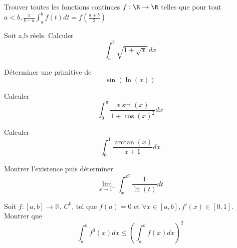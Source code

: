 \documentclass[11pt,a4paper]{article}
\begin{document}
\begin{exercise}
Trouver toutes les fonctions continues $f:\R\to\R$ telles que
pour tout $a\lt b, \frac{1}{b-a}\int_a^bf(t)dt=f\left(\frac{a+b}{2}\right)$
\end{exercise}

\begin{exercise}
Soit a,b réels. Calculer
\[\int_a^b\sqrt{1+\sqrt x}\,dx\]
\end{exercise}

\begin{exercise}
Déterminer une primitive de $$\sin(\ln(x))$$
\end{exercise}
\begin{exercise}
Calculer $$\int_0^{\pi}\frac{x\sin(x)}{1+\cos(x)^2}dx$$
\end{exercise}
\begin{exercise}
Calculer $$\int_0^1\frac{\arctan(x)}{x+1}dx$$
\end{exercise}
\begin{exercise}
Montrer l'existence puis déterminer $$\lim\limits_{x\rightarrow 1^-}\int_x^{x^2}\frac1{\ln(t)}dt$$
\end{exercise}
\begin{exercise}
Soit $f : [a,b]\rightarrow \mathbb R$, $C^0$, tel que $f(a)=0$ et $\forall x\in[a,b], f'(x)\in[0,1]$.
Montrer que $$\int_a^b f^3(x)dx\le(\int_a^b f(x)dx)^2$$
\end{exercise}
\end{document}
